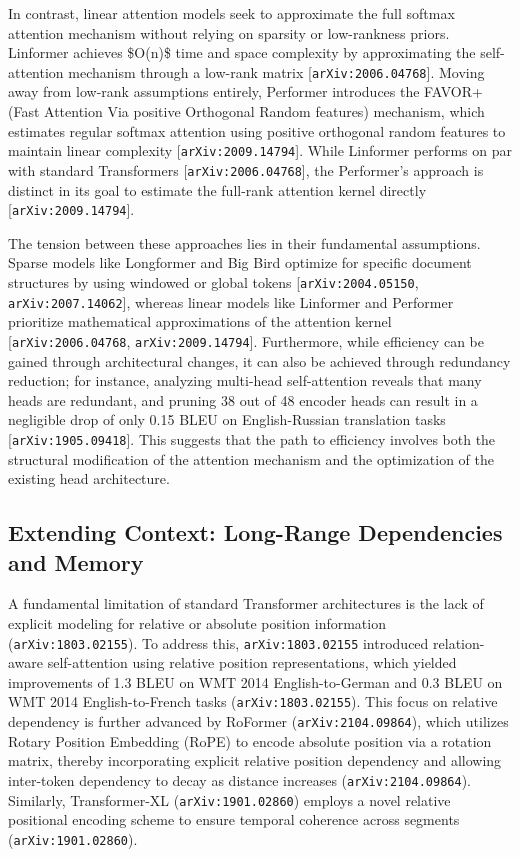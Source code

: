 \documentclass[11pt]{article}
\begin{document}
In contrast, linear attention models seek to approximate the full softmax attention mechanism without relying on sparsity or low-rankness priors. Linformer achieves \$O(n)\$ time and space complexity by approximating the self-attention mechanism through a low-rank matrix [\texttt{arXiv:2006.04768}]. Moving away from low-rank assumptions entirely, Performer introduces the FAVOR+ (Fast Attention Via positive Orthogonal Random features) mechanism, which estimates regular softmax attention using positive orthogonal random features to maintain linear complexity [\texttt{arXiv:2009.14794}]. While Linformer performs on par with standard Transformers [\texttt{arXiv:2006.04768}], the Performer's approach is distinct in its goal to estimate the full-rank attention kernel directly [\texttt{arXiv:2009.14794}].

The tension between these approaches lies in their fundamental assumptions. Sparse models like Longformer and Big Bird optimize for specific document structures by using windowed or global tokens [\texttt{arXiv:2004.05150}, \texttt{arXiv:2007.14062}], whereas linear models like Linformer and Performer prioritize mathematical approximations of the attention kernel [\texttt{arXiv:2006.04768}, \texttt{arXiv:2009.14794}]. Furthermore, while efficiency can be gained through architectural changes, it can also be achieved through redundancy reduction; for instance, analyzing multi-head self-attention reveals that many heads are redundant, and pruning 38 out of 48 encoder heads can result in a negligible drop of only 0.15 BLEU on English-Russian translation tasks [\texttt{arXiv:1905.09418}]. This suggests that the path to efficiency involves both the structural modification of the attention mechanism and the optimization of the existing head architecture.

\subsection{Extending Context: Long-Range Dependencies and Memory}

A fundamental limitation of standard Transformer architectures is the lack of explicit modeling for relative or absolute position information (\texttt{arXiv:1803.02155}). To address this, \texttt{arXiv:1803.02155} introduced relation-aware self-attention using relative position representations, which yielded improvements of 1.3 BLEU on WMT 2014 English-to-German and 0.3 BLEU on WMT 2014 English-to-French tasks (\texttt{arXiv:1803.02155}). This focus on relative dependency is further advanced by RoFormer (\texttt{arXiv:2104.09864}), which utilizes Rotary Position Embedding (RoPE) to encode absolute position via a rotation matrix, thereby incorporating explicit relative position dependency and allowing inter-token dependency to decay as distance increases (\texttt{arXiv:2104.09864}). Similarly, Transformer-XL (\texttt{arXiv:1901.02860}) employs a novel relative positional encoding scheme to ensure temporal coherence across segments (\texttt{arXiv:1901.02860}).
\end{document}
